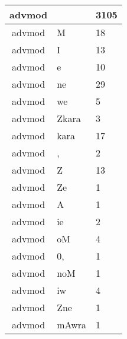\documentclass[a4 paper]{article}
\begin{document}
\begin{longtable}{cp{}p{}}
advmod &  & 3105\\ \midrule advmod & M & 18\\ \midrule advmod & I & 13\\ \midrule advmod & e & 10\\ \midrule advmod & ne & 29\\ \midrule advmod & we & 5\\ \midrule advmod & Zkara & 3\\ \midrule advmod & kara & 17\\ \midrule advmod & , & 2\\ \midrule advmod & Z & 13\\ \midrule advmod & Ze & 1\\ \midrule advmod & A & 1\\ \midrule advmod & ie & 2\\ \midrule advmod & oM & 4\\ \midrule advmod & 0, & 1\\ \midrule advmod & noM & 1\\ \midrule advmod & iw & 4\\ \midrule advmod & Zne & 1\\ \midrule advmod & mAwra & 1\\ \midrule 

\end{longtable}
\end{document}

